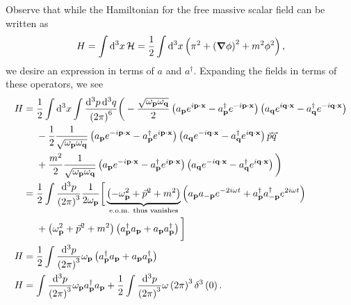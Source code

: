
Observe that while the Hamiltonian for the free massive scalar field can be written as
\begin{align}
    H = \int \dd{^3x} \mathcal{H} = \frac{1}{2} \int \dd{^3x} \left( \pi^2 + \left( \grad \phi \right)^2 + m^2 \phi^2 \right) 
,\end{align}
we desire an expression in terms of $a$ and $a^{\dag}$. Expanding the fields in terms of these operators, we see
\begin{align}
    H &= \frac{1}{2} \int \dd{^3x} \int \frac{\dd{^3p} \dd{^3q}}{\left( 2\pi \right)^{6}}  \bigg(-\frac{\sqrt{\omega_{\vb{p}} \omega_{\vb{q}}} }{2} \left( a_{\vb{p}} e^{i\vb{p}\cdot \vb{x}} - a^{\dag}_{\vb{p}} e^{-i \vb{p} \cdot \vb{x}} \right) \left( a_{\vb{q}} e^{i\vb{q}\cdot \vb{x}} - a^{\dag}_{\vb{q}} e^{-i \vb{q} \cdot \vb{x}} \right) \nonumber \\
    &\quad ~ -\frac{1}{2} \frac{1}{\sqrt{\omega_{\vb{p}} \omega_{\vb{q}}} } \left( a_{\vb{p}} e^{-i \vb{p} \cdot \vb{x}} - a_{\vb{p}}^{\dag}e^{i \vb{p} \cdot \vb{x}} \right)\left( a_{\vb{q}} e^{-i \vb{q} \cdot \vb{x}} - a^{\dag}_{\vb{q}}e^{i \vb{q} \cdot \vb{x}} \right) \vec{p} \vec{q} \nonumber\\
    & \quad~+ \frac{m^2}{2} \frac{1}{\sqrt{\omega_{\vb{p}} \omega_{\vb{q}}} } \left( a_{\vb{p}} e^{-i \vb{p} \cdot \vb{x}} - a^{\dag}_{\vb{p}}e^{i \vb{p} \cdot \vb{x}} \right)\left( a_{\vb{q}} e^{-i \vb{q} \cdot \vb{x}} - a^{\dag}_{\vb{q}}e^{i \vb{q} \cdot \vb{x}} \right) \bigg)\\
    &= \frac{1}{2} \int \frac{\dd{^3p}}{\left( 2\pi \right)^3} \frac{1}{2 \omega_{\vb{p}}} \bigg[ \underbrace{\left( - \omega_{\vb{p}}^2 +  \vec{p}^2 + m^2 \right)}_{\text{e.o.m. thus vanishes}} \left( a_{\vb{p}} a_{-\vb{p}} e^{-2i \omega t} + a_{\vb{p}}^{\dag} a_{-\vb{p}}^{\dag} e^{2i \omega t} \right)\\
        &\quad ~ + \left( \omega_{\vb{p}}^2 + \vec{p}^2 + m^2 \right) \left( a_{\vb{p}}^{\dag} a_{\vb{p}} + a_{\vb{p}} a_{\vb{p}}^{\dag} \right)  \bigg]  \\
        H &= \frac{1}{2} \int \frac{\dd{^3p}}{\left( 2\pi \right)^3} \omega_{\vb{p}} \left( a^{\dag}_{\vb{p}} a_{\vb{p}} + a_{\vb{p}} a^{\dag}_{\vb{p}} \right)  \\
        H &=  \int \frac{\dd{^3p}}{\left( 2\pi \right)^3} \omega_{\vb{p}} a^{\dag}_{\vb{p}} a_{\vb{p}} + \frac{1}{2}\int \frac{\dd{^3p}}{\left( 2\pi \right)^3} \omega \left( 2\pi \right)^3 \delta^{3}\left( 0 \right)  
.\end{align}

